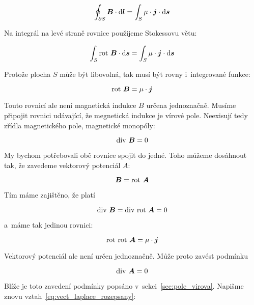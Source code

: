 \begin{equation}
\oint_{\partial S} \boldsymbol{B} \cdot \mathrm{d}\boldsymbol{l} = \int_S \mu \cdot \boldsymbol{j} \cdot \mathrm{d}\boldsymbol{s}
\end{equation}

Na integrál na levé straně rovnice použijeme Stokessovu větu:

\begin{equation}
\int_{S} \mathrm{rot} \ \boldsymbol{B} \cdot \mathrm{d}\boldsymbol{s} = \int_S \mu \cdot \boldsymbol{j} \cdot \mathrm{d}\boldsymbol{s}
\end{equation}

Protože plocha \(S\) může být libovolná, tak musí být rovny i~integrované funkce:

\begin{equation}
\mathrm{rot} \ \boldsymbol{B} = \mu \cdot \boldsymbol{j}
\end{equation}

Touto rovnicí ale není magnetická indukce \(B\) určena jednoznačně. Musíme připojit rovnici udávající, že megnetická indukce je vírové pole. Neexisují tedy zřídla magnetického pole, magnetické monopóly:

\begin{equation}
\mathrm{div} \ \boldsymbol{B} = 0
\end{equation}

My bychom potřebovali obě rovnice spojit do jedné. Toho můžeme dosáhnout tak, že zavedeme vektorový potenciál \(A\):

\begin{equation}
\boldsymbol{B} = \mathrm{rot} \ \boldsymbol{A}
\end{equation}

Tím máme zajištěno, že platí

\begin{equation}
\diverg \ \vect{B} = \diverg \ \rot \ \vect{A} = 0
\end{equation}

a~máme tak jedinou rovnici:

\begin{equation}
\mathrm{rot} \ \mathrm{rot} \ \boldsymbol{A} = \mu \cdot \boldsymbol{j}
\end{equation}

Vektorový potenciál ale není určen jednoznačně. Může proto zavést podmínku 

\begin{equation}
\mathrm{div} \ \boldsymbol{A} = 0
\end{equation}

Blíže je toto zavedení podmínky popsáno v~sekci~\ref{sec:pole_virova}. Napišme znovu vztah~\eqref{eq:vect_laplace_rozepsany}:


